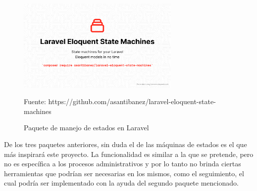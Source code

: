 \begin{figure}[!htpb]
    \centering
    \includegraphics[width=0.7\textwidth]{assets/laravelstatemachines}
    \caption{Paquete de manejo de estados en Laravel}{Fuente: https://github.com/asantibanez/laravel-eloquent-state-machines}
    \label{fig:laravelstatemachines}
\end{figure}

De los tres paquetes anteriores, sin duda el de las máquinas de estados es el que más inspirará este proyecto. La funcionalidad es similar a la que se pretende, pero no es específica a los procesos administrativos y por lo tanto no brinda ciertas herramientas que podrían ser necesarias en los mismos, como el seguimiento, el cual podría ser implementado con la ayuda del segundo paquete mencionado.
